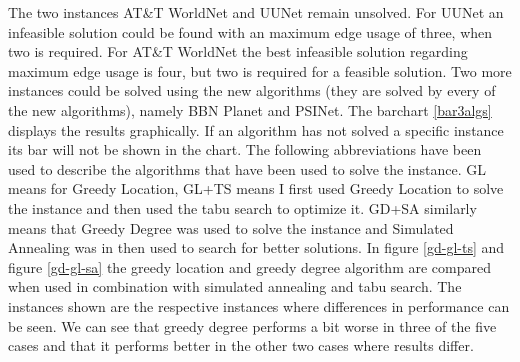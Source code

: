 \documentclass [12pt]{article}
\begin{document}
  The two instances AT\&T WorldNet and UUNet remain unsolved. For UUNet an infeasible solution could be found with an maximum edge usage of three, when two is required. 
  For AT\&T WorldNet the best infeasible solution regarding maximum edge usage is four, but two is required for a feasible solution. 
  Two more instances could be solved using the new algorithms (they are solved by every of the new algorithms), namely BBN Planet and PSINet.
  The barchart \ref{bar3algs} displays the results graphically. If an algorithm has not solved a specific instance its bar will not be shown in the chart.
  The following abbreviations have been used to describe the algorithms that have been used to solve the instance. GL means for Greedy Location, GL+TS means I first used Greedy Location
  to solve the instance and then used the tabu search to optimize it. GD+SA similarly means that Greedy Degree was used to solve the instance and Simulated Annealing was in then used
  to search for better solutions. In figure \ref{gd-gl-ts} and figure \ref{gd-gl-sa} the greedy location and greedy degree algorithm are compared when used in combination with simulated
  annealing and tabu search. The instances shown are the respective instances where differences in performance can be seen. We can see that greedy degree performs a bit worse in
  three of the five cases and that it performs better in the other two cases where results differ.
\end{document}
